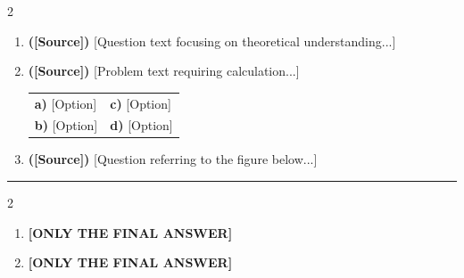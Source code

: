 \documentclass[12pt, a4paper]{article}
\begin{document}
\begin{multicols}{2} 
\begin{enumerate}[label=\textbf{Q\arabic*.}]

    \item \textbf{([Source])} [Question text focusing on theoretical understanding...]

    \item \textbf{([Source])} [Problem text requiring calculation...]
    \vspace{0.2cm}
    \begin{tabular}{ll}
        \textbf{a)} [Option] & \textbf{c)} [Option] \\
        \textbf{b)} [Option] & \textbf{d)} [Option]
    \end{tabular}

    \item \textbf{([Source])} [Question referring to the figure below...]
    \begin{center}
    \end{center}

\end{enumerate}
\end{multicols}

\newpage 
{} 
\vspace{0.2cm}
\hrule
\vspace{0.5cm}


\begin{multicols}{2}
\begin{enumerate}[label=\textbf{Q\arabic*.}]

    \item \textbf{[ONLY THE FINAL ANSWER]} \\
    
    \item \textbf{[ONLY THE FINAL ANSWER]} \\
    

\end{enumerate}
\end{multicols}
\end{document}
